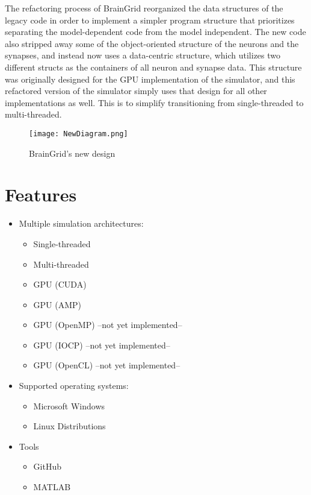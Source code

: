 \documentclass[11pt]{article}
\begin{document}
\noindent \mdseries The refactoring process of BrainGrid reorganized the data structures of the legacy code in order to implement a simpler program structure that prioritizes separating the model-dependent code from the model independent. The new code also stripped away some of the object-oriented structure of the neurons and the synapses, and instead now uses a data-centric structure, which utilizes two different structs as the containers of all neuron and synapse data. This structure was originally designed for the GPU implementation of the simulator, and this refactored version of the simulator simply uses that design for all other implementations as well. This is to simplify transitioning from single-threaded to multi-threaded.

\begin{figure}
	\centering
		\texttt{[image: NewDiagram.png]}
		\caption{BrainGrid's new design}
\end{figure}
\pagebreak

\mdseries 
\section{Features}
\begin{itemize}
	\item Multiple simulation architectures:
	\begin{itemize}
		\item	Single-threaded
		\item Multi-threaded
		\item GPU (CUDA)
		\item GPU (AMP)
		\item GPU (OpenMP) --not yet implemented--
		\item GPU (IOCP) --not yet implemented--
		\item GPU (OpenCL) --not yet implemented--
	\end{itemize}
	\item Supported operating systems:
	\begin{itemize}
		\item Microsoft Windows
		\item Linux Distributions
	\end{itemize}
	\item Tools
	\begin{itemize}
		\item GitHub
		\item MATLAB
	\end{itemize}
\end{itemize}
\pagebreak
\end{document}
